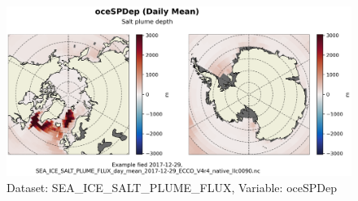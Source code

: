 \begin{figure}[H]
\centering
\includegraphics[scale=0.55]{../images/plots/native_plots/Sea-Ice_Salt_Plume_Fluxes/oceSPDep.png}
\caption{Dataset: SEA\_ICE\_SALT\_PLUME\_FLUX, Variable: oceSPDep}
\label{tab:table-SEA_ICE_SALT_PLUME_FLUX_oceSPDep-Plot}
\end{figure}
\pagebreak
